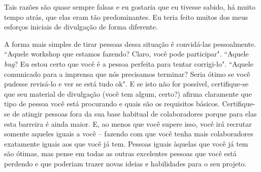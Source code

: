 Tais razões são quase sempre falsas e eu gostaria que eu tivesse sabido, há muito tempo atrás, que
elas eram tão predominantes. Eu teria feito muitos dos meus esforços iniciais de divulgação
de forma diferente.

A forma mais simples de tirar pessoas dessa situação é convidá-las pessoalmente.
``Aquele workshop que estamos fazendo? Claro, você pode participar". ``Aquele
\textit{bug}? Eu estou certo que você é a pessoa perfeita para tentar corrigi-lo".
``Aquele comunicado para a imprensa que nós precisamos terminar? Seria ótimo se
você pudesse revisá-lo e ver se está tudo ok". E se isto não for possível, certifique-se
que seu material de divulgação (você tem algum, certo?) afirma claramente que tipo
de pessoa você está procurando e quais são os requisitos básicos. Certifique-se de
atingir pessoas fora da sua base habitual de colaboradores porque para elas esta
barreira é ainda maior. E, ao menos que você supere isso, você irá recrutar somente
aqueles iguais a você -- fazendo com que você tenha mais colaboradores exatamente
iguais aos que você já tem. Pessoas iguais àquelas que você já tem são ótimas,
mas pense em todas as outras excelentes pessoas que você está perdendo e que poderiam
trazer novas ideias e habilidades para o seu projeto.

